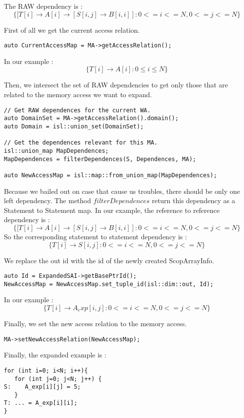 The RAW dependency is :
\[
\{[T[i] \rightarrow A[i] \rightarrow [S[i,j] \rightarrow B[i,i]]:0<=i<=N,0<=j<=N\}
\]

First of all we get the current access relation.
\begin{lstlisting}[frame=single]
auto CurrentAccessMap = MA->getAccessRelation();
\end{lstlisting}
In our example :
\[
\{ T[i] \rightarrow A[i] : 0 \le i \le N\}
\]

Then, we intersect the set of RAW dependencies to get only those that are related to the memory access we want to expand.
\begin{lstlisting}[frame=single]
// Get RAW dependences for the current WA.
auto DomainSet = MA->getAccessRelation().domain();
auto Domain = isl::union_set(DomainSet);

// Get the dependences relevant for this MA.
isl::union_map MapDependences;
MapDependences = filterDependences(S, Dependences, MA);

auto NewAccessMap = isl::map::from_union_map(MapDependences);
\end{lstlisting}
Because we bailed out on case that cause us troubles, there should be only one left dependency. The method $filterDependences$ return this dependency as a Statement to Statement map.
In our example, the reference to reference dependency is :
\[
\{[T[i] \rightarrow A[i] \rightarrow [S[i,j] \rightarrow B[i,i]]:0<=i<=N,0<=j<=N\}
\]
So the corresponding statement to statement dependency is :
\[
\{T[i] \rightarrow S[i,j] : 0<=i<=N,0<=j<=N\}
\]

We replace the out id with the id of the newly created ScopArrayInfo.
\begin{lstlisting}[frame=single]
auto Id = ExpandedSAI->getBasePtrId();
NewAccessMap = NewAccessMap.set_tuple_id(isl::dim::out, Id);
\end{lstlisting}
In our example :
\[
\{T[i] \rightarrow A_exp[i,j] : 0<=i<=N,0<=j<=N\}
\]

Finally, we set the new access relation to the memory access.
\begin{lstlisting}[frame=single]
MA->setNewAccessRelation(NewAccessMap);
\end{lstlisting}

Finally, the expanded example is :
\begin{lstlisting}[frame=single]
for (int i=0; i<N; i++){
   for (int j=0; j<N; j++) {
S:    A_exp[i][j] = 5;
   }
T: ... = A_exp[i][i];
}
\end{lstlisting}

